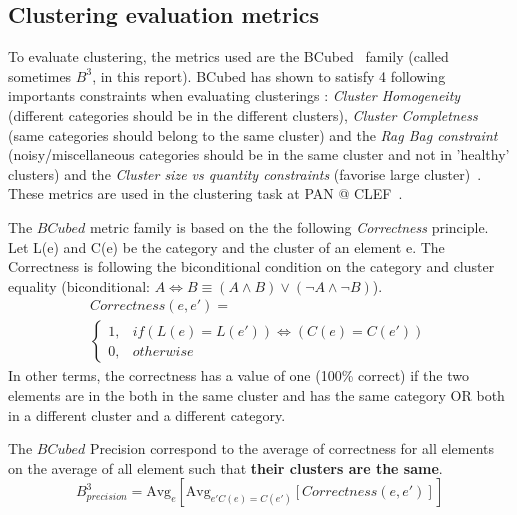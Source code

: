 \subsection{Clustering evaluation metrics}

To evaluate clustering, the metrics used are the BCubed~\cite{bcubed} family (called sometimes $B^3$, in this report).
BCubed has shown to satisfy 4 following importants constraints when evaluating clusterings : \textit{Cluster Homogeneity} (different categories should be in the different clusters), \textit{Cluster Completness} (same categories should belong to the same cluster) and the \textit{Rag Bag constraint} (noisy/miscellaneous categories should be in the same cluster and not in 'healthy' clusters) and the \textit{Cluster size vs quantity constraints} (favorise large cluster)~\cite{bcubed}.
These metrics are used in the clustering task at PAN @ CLEF~\cite{pan16}.

\begin{definition}
  The $BCubed$ metric family is based on the the following \textit{Correctness} principle.
  Let L(e) and C(e) be the category and the cluster of an element e.
  The Correctness is following the biconditional condition on the category and cluster equality (biconditional: $A \Longleftrightarrow B \equiv (A \land B) \lor (\neg A \land \neg B)$).
  \begin{gather*}
    Correctness(e, e') = \\
    \begin{cases}
      1, & if (L(e) = L(e')) \Longleftrightarrow (C(e) = C(e'))\\
      0, & otherwise
    \end{cases}
  \end{gather*}
  In other terms, the correctness has a value of one (100\% correct) if the two elements are in the both in the same cluster and has the same category OR both in a different cluster and a different category.
\end{definition}

\begin{definition}
  The $BCubed$ Precision correspond to the average of correctness for all elements on the average of all element such that \textbf{their clusters are the same}.
  \begin{equation}
    B^3_{precision} = \text{Avg}_{e}[\text{Avg}_{e' C(e)=C(e')}[Correctness(e, e')]]
  \end{equation}
\end{definition}

